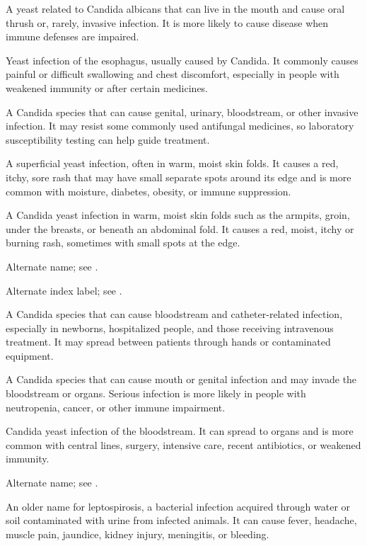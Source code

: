  A yeast related to Candida albicans that can live in the mouth and cause oral thrush or, rarely, invasive infection. It is more likely to cause disease when immune defenses are impaired.

 Yeast infection of the esophagus, usually caused by Candida. It commonly causes painful or difficult swallowing and chest discomfort, especially in people with weakened immunity or after certain medicines.

 A Candida species that can cause genital, urinary, bloodstream, or other invasive infection. It may resist some commonly used antifungal medicines, so laboratory susceptibility testing can help guide treatment.

 A superficial yeast infection, often in warm, moist skin folds. It causes a red, itchy, sore rash that may have small separate spots around its edge and is more common with moisture, diabetes, obesity, or immune suppression.

 A Candida yeast infection in warm, moist skin folds such as the armpits, groin, under the breasts, or beneath an abdominal fold. It causes a red, moist, itchy or burning rash, sometimes with small spots at the edge.

 Alternate name; see .

 Alternate index label; see .

 A Candida species that can cause bloodstream and catheter-related infection, especially in newborns, hospitalized people, and those receiving intravenous treatment. It may spread between patients through hands or contaminated equipment.

 A Candida species that can cause mouth or genital infection and may invade the bloodstream or organs. Serious infection is more likely in people with neutropenia, cancer, or other immune impairment.

 Candida yeast infection of the bloodstream. It can spread to organs and is more common with central lines, surgery, intensive care, recent antibiotics, or weakened immunity.

 Alternate name; see .

 An older name for leptospirosis, a bacterial infection acquired through water or soil contaminated with urine from infected animals. It can cause fever, headache, muscle pain, jaundice, kidney injury, meningitis, or bleeding.

